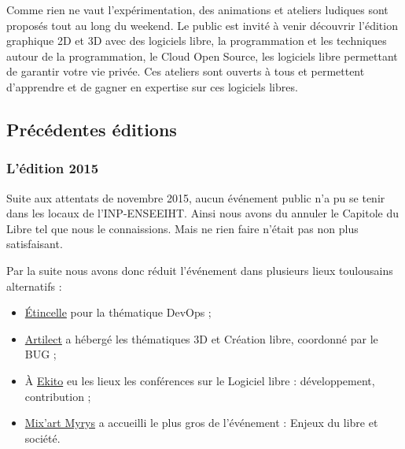 \begin{minipage}{0.6\textwidth}

Comme rien ne vaut l'expérimentation, des animations et ateliers ludiques sont proposés tout au long du weekend. Le public est invité à venir découvrir l'édition graphique 2D et 3D avec des logiciels libre, la programmation et les techniques autour de la programmation, le Cloud Open Source, les logiciels libre permettant de garantir votre vie privée.
Ces ateliers sont ouverts à tous et permettent d'apprendre et de gagner en expertise sur ces logiciels libres.

\end{minipage}
\begin{minipage}{0.4\textwidth}
\begin{center}
\end{center}
\end{minipage}


\subsection{Précédentes éditions}

\subsubsection{L'édition 2015}

\label{ed2015}

Suite aux attentats de novembre 2015, aucun événement public n'a pu se tenir dans les locaux de l'INP-ENSEEIHT. Ainsi nous avons du annuler le Capitole du Libre tel que nous le connaissions. Mais ne rien faire n'était pas non plus satisfaisant. 

Par la suite nous avons donc réduit l'événement dans plusieurs lieux toulousains alternatifs :

\begin{itemize}[label=$\bullet$]
\item  \href{http://www.coworking-toulouse.com}{Étincelle} pour la thématique DevOps ;
\item  \href{http://www.artilect.fr}{Artilect} a hébergé les thématiques 3D et Création libre, coordonné par le BUG ;
\item À \href{https://www.ekito.fr}{Ekito} eu les lieux les conférences sur le Logiciel libre : développement, contribution ;
\item \href{http://mixart-myrys.org/le-lieu/}{Mix'art Myrys} a accueilli le plus gros de l'événement : Enjeux du libre et société.
\end{itemize}

